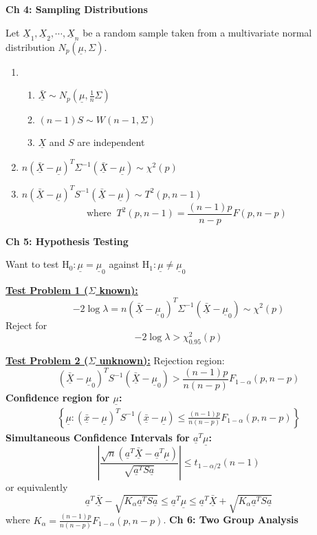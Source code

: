 \documentclass[a4paper]{article}
\newcommand{\subheading}[1]{{\scriptsize\textbf{#1}}}
\begin{document}
\begin{multicols*}{4}
\smallskip
\hline
\smallskip

\subheading{Ch 4: Sampling Distributions}

Let $\underline{X}_1, \underline{X}_2, \cdots, \underline{X}_n$ be a random sample taken from a multivariate normal distribution $N_p(\underline{\mu}, \Sigma)$.
\begin{enumerate}
    \item 
    \begin{enumerate}
        \item $\underline{\bar{X}} \sim N_p\left(\underline{\mu}, \frac{1}{n} \Sigma\right)$
        \item $(n-1) S \sim W(n-1, \Sigma)$
        \item $\underline{X}$ and $S$ are independent
    \end{enumerate}
    \item $n(\underline{\bar{X}}-\underline{\mu})^T \Sigma^{-1}(\underline{\bar{X}}-\underline{\mu}) \sim \chi^2(p)$
    \item $n(\underline{\bar{X}}-\underline{\mu})^T S^{-1}(\underline{\bar{X}}-\underline{\mu}) \sim T^2(p, n-1)$ \\
$$
\text{where} \;\;  T^2(p, n-1)=\frac{(n-1) p}{n-p} F(p, n-p)
$$
\end{enumerate}
\hline
\smallskip
\subheading{Ch 5: Hypothesis Testing}

Want to test $\mathrm{H}_0: \underline{\mu}=\underline{\mu}_0$ against $\mathrm{H}_1: \underline{\mu} \neq \underline{\mu}_0$

\textbf{\underline{Test Problem 1 ($\Sigma$ known):}}
$$-2 \log \lambda=n\left(\underline{\bar{X}}-\underline{\mu}_0\right)^T \Sigma^{-1}\left(\underline{\bar{X}}-\underline{\mu}_0\right) \sim \chi^2(p)$$
Reject for $$-2 \log \lambda > \chi_{0.95}^2(p)$$

\textbf{\underline{Test Problem 2 ($\Sigma$ unknown):}} Rejection region:
$$
\left(\underline{\bar{X}}-\underline{\mu}_0\right)^T S^{-1}\left(\underline{\bar{X}}-\underline{\mu}_0\right)>\frac{(n-1) p}{n(n-p)} F_{1-\alpha}(p, n-p)
$$
\textbf{Confidence region for $\underline{\mu}$:}
$$
\begin{aligned}
\left\{\underline{\mu} : (\underline{\bar{x}}-\underline{\mu})^T S^{-1}(\underline{\bar{x}}-\underline{\mu}) \leq \frac{(n-1) p}{n(n-p)} F_{1-\alpha}(p, n-p)\right\}
\end{aligned}
$$
\textbf{Simultaneous Confidence Intervals for $\underline{a}^T \underline{\mu}$:}
$$
\left|\frac{\sqrt{n}\left(\underline{a}^T \underline{\bar{X}}-\underline{a}^T \underline{\mu}\right)}{\sqrt{\underline{a}^T S \underline{a}}}\right| \leq t_{1-\alpha / 2}(n-1)
$$
or equivalently
$$
\underline{a}^T \underline{\bar{X}}-\sqrt{K_\alpha \underline{a}^T S \underline{a}} \leq \underline{a}^T \underline{\mu} \leq \underline{a}^T \underline{\bar{X}}+\sqrt{K_\alpha \underline{a}^T S \underline{a}}
$$
where $K_\alpha=\frac{(n-1) p}{n(n-p)} F_{1-\alpha}(p, n-p)$.
\smallskip
\hline
\smallskip
\subheading{Ch 6: Two Group Analysis}


\end{multicols*}
\end{document}
